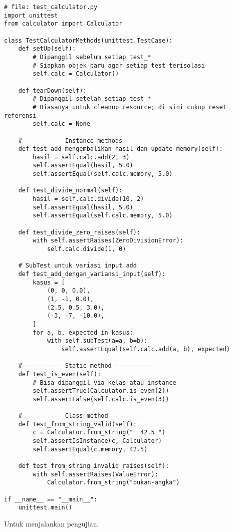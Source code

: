 \begin{lstlisting}[style=PythonStyle, caption={Pengujian method kelas dengan unittest}, label={lst:test-method}]
# file: test_calculator.py
import unittest
from calculator import Calculator

class TestCalculatorMethods(unittest.TestCase):
    def setUp(self):
        # Dipanggil sebelum setiap test_*
        # Siapkan objek baru agar setiap test terisolasi
        self.calc = Calculator()

    def tearDown(self):
        # Dipanggil setelah setiap test_*
        # Biasanya untuk cleanup resource; di sini cukup reset referensi
        self.calc = None

    # ---------- Instance methods ----------
    def test_add_mengembalikan_hasil_dan_update_memory(self):
        hasil = self.calc.add(2, 3)
        self.assertEqual(hasil, 5.0)
        self.assertEqual(self.calc.memory, 5.0)

    def test_divide_normal(self):
        hasil = self.calc.divide(10, 2)
        self.assertEqual(hasil, 5.0)
        self.assertEqual(self.calc.memory, 5.0)

    def test_divide_zero_raises(self):
        with self.assertRaises(ZeroDivisionError):
            self.calc.divide(1, 0)

    # SubTest untuk variasi input add
    def test_add_dengan_variansi_input(self):
        kasus = [
            (0, 0, 0.0),
            (1, -1, 0.0),
            (2.5, 0.5, 3.0),
            (-3, -7, -10.0),
        ]
        for a, b, expected in kasus:
            with self.subTest(a=a, b=b):
                self.assertEqual(self.calc.add(a, b), expected)

    # ---------- Static method ----------
    def test_is_even(self):
        # Bisa dipanggil via kelas atau instance
        self.assertTrue(Calculator.is_even(2))
        self.assertFalse(self.calc.is_even(3))

    # ---------- Class method ----------
    def test_from_string_valid(self):
        c = Calculator.from_string("  42.5 ")
        self.assertIsInstance(c, Calculator)
        self.assertEqual(c.memory, 42.5)

    def test_from_string_invalid_raises(self):
        with self.assertRaises(ValueError):
            Calculator.from_string("bukan-angka")

if __name__ == "__main__":
    unittest.main()
\end{lstlisting}

Untuk menjalankan pengujian:

